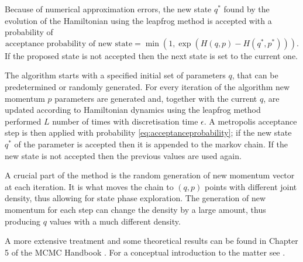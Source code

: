 Because of numerical approximation errors, the new state $q^*$ found by the evolution of the Hamiltonian using the leapfrog method is accepted with a probability of 
\begin{equation}
	\text{acceptance probability of new state} = \min(1,\exp \left(H(q,p) - H(q^*,p^*)\right) ).
	\label{eq:acceptanceprobability}
\end{equation}
If the proposed state is not accepted then the next state is set to the current one. 

The algorithm starts with a specified initial set of parameters $q$, that can be predetermined or randomly generated. For every iteration of the algorithm new momentum $p$ parameters are generated and, together with the current $q$, are updated according to Hamiltonian dynamics using the leapfrog method performed $L$ number of times with discretisation time $\epsilon$. A metropolis acceptance step is then applied with probability \eqref{eq:acceptanceprobability}; if the new state $q^*$ of the parameter is accepted then it is appended to the markov chain. If the new state is not accepted then the previous values are used again. 

A crucial part of the method is the random generation of new momentum vector at each iteration. It is what moves the chain to $(q,p)$ points with different joint density, thus allowing for state phase exploration. The generation of new momentum for each step can change the density by a large amount, thus producing $q$ values with a much different density.

A more extensive treatment and some theoretical results can be found in Chapter 5 of the MCMC Handbook \cite{brooks_mcmc_2011}. For a conceptual introduction to the matter see \cite{betancourt_conceptual_2017}.


%	
%
%
%	
%		
%		
